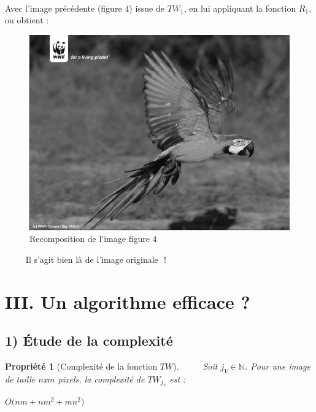 \documentclass[a4paper,10pt]{report}
\theoremstyle{break}
\newtheorem{Prop}{Propri\'{e}t\'{e}}
\begin{document}
    
    \paragraph{} Avec l'image pr\'{e}c\'{e}dente (figure $4$) issue de $TW_1$, en lui appliquant la fonction $R_1$, on obtient :
    
      \begin{figure}[!h]
	    \centering
	    
	    \includegraphics[width = 0.4 \linewidth]{ara_decomp.eps}
	    
	    \caption{Recomposition de l'image figure $4$}
      \end{figure}
      $\phantom{Prop}$ Il s'agit bien l\`{a} de l'image originale $\phantom{ }$ !

\newpage

\section*{III. Un algorithme efficace ?}

  \subsection*{1) \'{E}tude de la complexit\'{e}}
    
    \begin{Prop}[Complexit\'{e} de la fonction $TW$]
      $\phantom{Prop}$ Soit $j_V \in \mathbb{N}$. Pour une image de taille $n$x$m$ pixels, la complexit\'{e} de $TW_{j_V}$ est :
      \begin{center}
	$ \boxed{O \Big(nm + n m^2 + m n^2 \Big)} $
      \end{center}

    \end{Prop}
    
\end{document}
